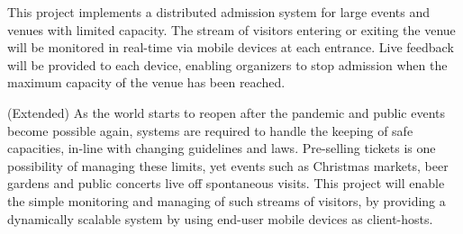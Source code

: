 \documentclass[runningheads]{llncs}
\begin{document}
This project implements a distributed admission system for large events and venues with limited capacity.
The stream of visitors entering or exiting the venue will be monitored in real-time via mobile devices at each entrance.
Live feedback will be provided to each device, enabling organizers to stop admission when the maximum capacity of the venue has been reached.

(Extended) As the world starts to reopen after the pandemic and public events become possible again, systems are required to handle the keeping of safe capacities, in-line with changing guidelines and laws. Pre-selling tickets is one possibility of managing these limits, yet events such as Christmas markets, beer gardens and public concerts live off spontaneous visits. This project will enable the simple monitoring and managing of such streams of visitors, by providing a dynamically scalable system by using end-user mobile devices as client-hosts.
\end{document}
